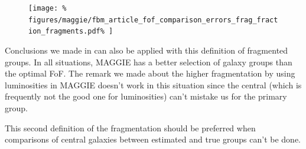 \begin{figure}[htb]
    \centering
    \begin{minipage}{0.39\linewidth}
        \texttt{[image: \%
figures/maggie/fbm\_article\_fof\_comparison\_errors\_frag\_fraction\_fragments.pdf\%
        ]}
    \end{minipage}
    \begin{minipage}{0.59\linewidth}
        \centering
        \begin{minipage}{\linewidth}
        \end{minipage}
        \begin{minipage}{\linewidth}
        \end{minipage}
    \end{minipage}
\end{figure}

Conclusions we made in  can also be applied with this
definition of fragmented groups. In all situations, MAGGIE has a better
selection of galaxy groups than the optimal FoF. The remark we made about the
higher fragmentation by using luminosities in MAGGIE doesn't work in this
situation since the central (which is frequently not the good one for
luminosities) can't mistake us for the primary group.

This second definition of the fragmentation should be preferred when
comparisons of central galaxies between estimated and true groups can't be
done.


